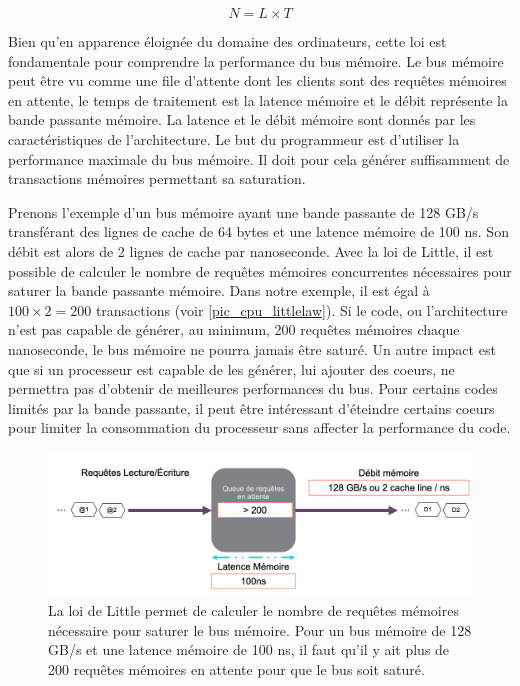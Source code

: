         \begin{equation} \label{eq:little}
            N = L \times T
        \end{equation}
        
        Bien qu'en apparence éloignée du domaine des ordinateurs, cette loi est fondamentale pour comprendre la performance du bus mémoire. Le bus mémoire peut être vu comme une file d'attente dont les clients sont des requêtes mémoires en attente, le temps de traitement est la latence mémoire et le débit représente la bande passante mémoire. La latence et le débit mémoire sont donnés par les caractéristiques de l'architecture. Le but du programmeur est d'utiliser la performance maximale du bus mémoire. Il doit pour cela générer suffisamment de transactions mémoires permettant sa saturation.
        
        Prenons l'exemple d'un bus mémoire ayant une bande passante de 128 GB/s transférant des lignes de cache de 64 bytes et une latence mémoire de 100 ns. Son débit est alors de 2 lignes de cache par nanoseconde. Avec la loi de Little, il est possible de calculer le nombre de requêtes mémoires concurrentes nécessaires pour saturer la bande passante mémoire. Dans notre exemple, il est égal à $100 \times 2 = 200$ transactions (voir \autoref{pic_cpu_littlelaw}). 
        Si le code, ou l’architecture n’est pas capable de générer, au minimum, 200 requêtes mémoires chaque nanoseconde, le bus mémoire ne pourra jamais être saturé. Un autre impact est que si un processeur est capable de les générer, lui ajouter des coeurs, ne permettra pas d’obtenir de meilleures performances du bus. Pour certains codes limités par la bande passante, il peut être intéressant d’éteindre certains coeurs pour limiter la consommation du processeur sans affecter la performance du code.
        
        
        \begin{figure}
            \center
            \includegraphics[width=12cm]{images/cpu_littlelaw.png}
            \caption{ La loi de Little permet de calculer le nombre de requêtes mémoires nécessaire pour saturer le bus mémoire. Pour un bus mémoire de 128 GB/s et une latence mémoire de 100 ns, il faut qu'il y ait plus de 200 requêtes mémoires en attente pour que le bus soit saturé.
            \label{pic_cpu_littlelaw}}
        \end{figure}
        

